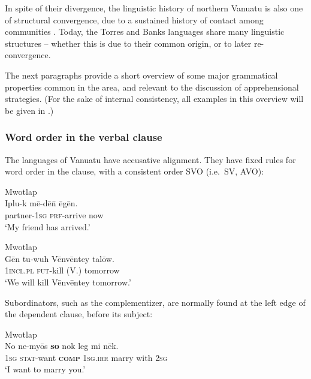 \documentclass[output=paper,colorlinks,citecolor=brown]{langscibook}
\begin{document}
In spite of their divergence, the linguistic history of northern Vanuatu is also one of structural convergence, due to a sustained history of contact among communities \citep{François2011}. Today, the Torres and Banks languages share many linguistic structures -- whether this is due to their common origin, or to later re-convergence. 

The next paragraphs provide a short overview of some major grammatical properties common in the area, and relevant to the discussion of apprehensional strategies. (For the sake of internal consistency, all examples in this overview will be given in .)




\subsubsection{Word order in the verbal clause}
\label{subsubsec:wordorder}

The languages of Vanuatu have accusative alignment. They have fixed rules for word order in the clause, with a consistent order SVO (i.e.\ SV, AVO):

\ea \label{ex:Fra5} \textnormal{Mwotlap}\\
\gll Iplu-k mē-dē\={n} ēgēn. \\
partner-\textsc{1sg} \textsc{prf}-arrive now \\
\glt `My friend has arrived.' 
\z

    \ea \label{ex:Fra6} \textnormal{Mwotlap} \\
\gll Gēn tu-wuh Vēnvēntey talōw. \\
\textsc{1incl.pl} \textsc{fut}-kill (V.) tomorrow \\
\glt `We will kill Vēnvēntey tomorrow.' 
\z

Subordinators, such as the complementizer, are normally found at the left edge of the dependent clause, before its subject:
 
    \ea \label{ex:Fra7} \textnormal{Mwotlap} \\
\gll No ne-myōs \textbf{so} nok leg mi nēk. \\
\textsc{1sg} \textsc{stat}-want \textsc{\textbf{comp}} \textsc{1sg.irr} marry with \textsc{2sg} \\
\glt `I want to marry you.' 
\z
\end{document}
